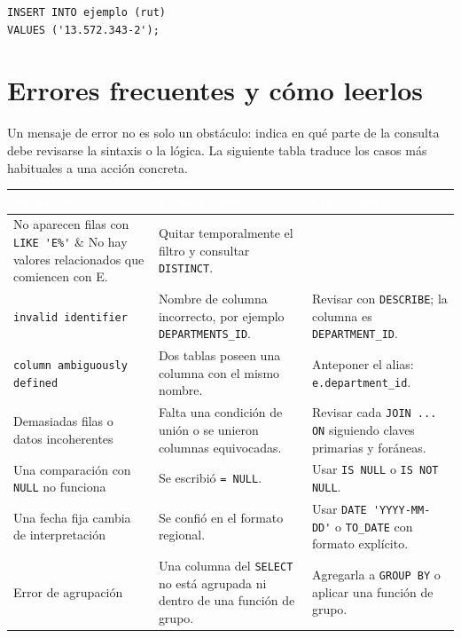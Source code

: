 \documentclass[10pt,letterpaper]{article}
\begin{document}
\begin{lstlisting}
INSERT INTO ejemplo (rut)
VALUES ('13.572.343-2');
\end{lstlisting}

\section{Errores frecuentes y cómo leerlos}

Un mensaje de error no es solo un obstáculo: indica en qué parte de la consulta
debe revisarse la sintaxis o la lógica. La siguiente tabla traduce los casos más
habituales a una acción concreta.

\begin{longtable}{>{\raggedright\arraybackslash}p{5cm}
                  >{\raggedright\arraybackslash}p{5cm}
                  >{\raggedright\arraybackslash}p{5cm}}
\toprule
\rowcolor{azulsql}
\textcolor{white}{\textbf{Situación}} &
\textcolor{white}{\textbf{Causa común}} &
\textcolor{white}{\textbf{Corrección}} \\
\midrule
\endhead
No aparecen filas con \lstinline|LIKE 'E%'| & No hay valores relacionados que
comiencen con E. & Quitar temporalmente el filtro y consultar
\lstinline|DISTINCT|. \\
\lstinline|invalid identifier| & Nombre de columna incorrecto, por ejemplo
\lstinline|DEPARTMENTS_ID|. & Revisar con \lstinline|DESCRIBE|; la columna es
\lstinline|DEPARTMENT_ID|. \\
\lstinline|column ambiguously defined| & Dos tablas poseen una columna con el
mismo nombre. & Anteponer el alias: \lstinline|e.department_id|. \\
Demasiadas filas o datos incoherentes & Falta una condición de unión o se unieron
columnas equivocadas. & Revisar cada \lstinline|JOIN ... ON| siguiendo claves
primarias y foráneas. \\
Una comparación con \lstinline|NULL| no funciona & Se escribió
\lstinline|= NULL|. & Usar \lstinline|IS NULL| o \lstinline|IS NOT NULL|. \\
Una fecha fija cambia de interpretación & Se confió en el formato regional. &
Usar \lstinline|DATE 'YYYY-MM-DD'| o \lstinline|TO_DATE| con formato explícito. \\
Error de agrupación & Una columna del \lstinline|SELECT| no está agrupada ni
dentro de una función de grupo. & Agregarla a \lstinline|GROUP BY| o aplicar una
función de grupo. \\
\bottomrule
\end{longtable}
\end{document}
